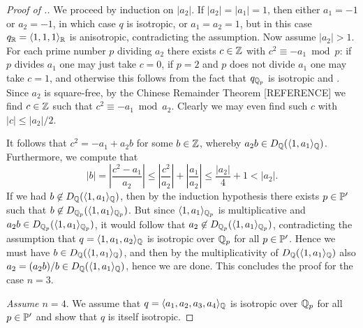 \documentclass[12pt, leqno, british]{amsart}
\begin{document}
\begin{proof}[Proof of .]
We proceed by induction on $\lvert a_2 \rvert$.
If $\lvert a_2 \rvert = \lvert a_1 \rvert = 1$, then either $a_1 = -1$ or $a_2 = -1$, in which case $q$ is isotropic, or $a_1 = a_2 = 1$, but in this case $q_\mathbb R = \langle 1, 1, 1 \rangle_\mathbb R$ is anisotropic, contradicting the assumption.
Now assume $\lvert a_2 \rvert > 1$.
For each prime number $p$ dividing $a_2$ there exists $c \in \mathbb Z$ with $c^2 \equiv -a_1 \bmod p$: if $p$ divides $a_1$ one may just take $c = 0$, if $p = 2$ and $p$ does not divide $a_1$ one may take $c = 1$, and otherwise this follows from the fact that $q_{\mathbb Q_p}$ is isotropic and .
Since $a_2$ is square-free, by the Chinese Remainder Theorem [REFERENCE] we find $c \in \mathbb Z$ such that $c^2 \equiv -a_1 \bmod a_2$.
Clearly we may even find such $c$ with $\lvert c \rvert \leq \lvert a_2 \rvert/2$.

It follows that $c^2 = -a_1 + a_2b$ for some $b \in \mathbb Z$, whereby $a_2b \in D_\mathbb Q(\langle 1, a_1 \rangle_\mathbb Q)$.
Furthermore, we compute that
$$ \lvert b \rvert = \left\lvert \frac{c^2 - a_1}{a_2} \right\rvert \leq \left\lvert \frac{c^2}{a_2} \right\rvert + \left\lvert \frac{a_1}{a_2} \right\rvert \leq \frac{\lvert a_2 \rvert}{4} + 1 < \lvert a_2 \rvert.$$
If we had $b \not\in D_\mathbb Q(\langle 1, a_1 \rangle_{\mathbb Q})$, then by the induction hypothesis there exists $p \in \mathbb P'$ such that $b \not\in D_{\mathbb Q_p}(\langle 1, a_1 \rangle_{\mathbb Q_p})$.
But since $\langle 1, a_1 \rangle_{\mathbb Q_p}$ is multiplicative and $a_2b \in D_{\mathbb Q_p}(\langle 1, a_1 \rangle_{\mathbb Q_p})$, it would follow that $a_2 \not\in  D_{\mathbb Q_p}(\langle 1, a_1 \rangle_{\mathbb Q_p})$, contradicting the assumption that $q = \langle 1, a_1, a_2 \rangle_{\mathbb Q}$ is isotropic over $\mathbb Q_p$ for all $p \in \mathbb P'$.
Hence we must have $b \in D_\mathbb Q(\langle 1, a_1 \rangle_{\mathbb Q})$, and then by the multiplicativity of $ D_\mathbb Q(\langle 1, a_1 \rangle_{\mathbb Q})$ also $a_2 = (a_2b)/b \in D_{\mathbb Q}(\langle 1, a_1 \rangle_{\mathbb Q})$, hence we are done.
This concludes the proof for the case $n = 3$.

\emph{Assume $n = 4$}.
We assume that $q = \langle a_1, a_2, a_3, a_4 \rangle_{\mathbb Q}$ is isotropic over $\mathbb Q_p$ for all $p \in \mathbb P'$ and show that $q$ is itself isotropic.


\end{proof}
\end{document}
